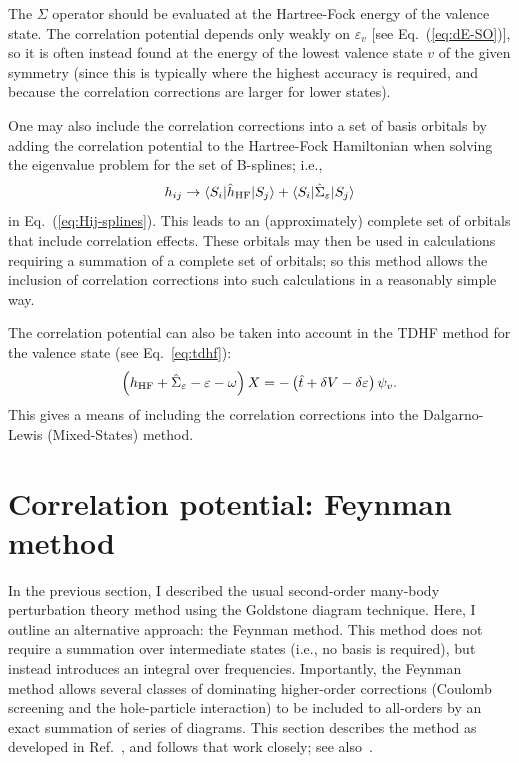 \documentclass[10pt,twocolumn,a4paper]{article}%
\newcommand{\bra}[1]{\ensuremath{\langle #1|}}	%
\newcommand{\ket}[1]{\ensuremath{|#1\rangle}}
\newcommand{\be}{\begin{equation}}
\newcommand{\ee}{\end{equation}}
\def\en{\ensuremath{\varepsilon}}
\newcommand{\w}{\ensuremath{\omega}}
\begin{document}
The $\Sigma$ operator should be evaluated at the Hartree-Fock energy of the valence state.
The correlation potential depends only weakly on $\en_v$ [see Eq.~(\ref{eq:dE-SO})],
so it is often instead found at the energy of the lowest valence state $v$ of the given symmetry (since this is typically where the highest accuracy is required, and because the correlation corrections are larger for lower states).


One may also include the correlation corrections into a set of basis orbitals by adding the correlation potential to the Hartree-Fock Hamiltonian when solving the eigenvalue problem for the set of B-splines; i.e.,
\be
h_{ij} \to \bra{S_i}\hat h_{\rm HF}\ket{S_j}  + \bra{S_i}\hat \Sigma_\en\ket{S_j} 
\ee
in Eq.~(\ref{eq:Hij-splines}).
This leads to an (approximately) complete set of orbitals that include correlation effects.
These orbitals may then be used in calculations requiring a summation of a complete set of orbitals; so this method allows the inclusion of correlation corrections into such calculations in a reasonably simple way.


The correlation potential can also be taken into account in the TDHF method for the valence state (see Eq.~\eqref{eq:tdhf}):
\be
\left( h_{\rm HF} +\hat\Sigma_\en -  \en -\w \right)X = -\left(\hat t + \delta V - \delta \en \right)\psi_v.
\ee
This gives a means of including the correlation corrections into the Dalgarno-Lewis (Mixed-States) method.




\section{Correlation potential: Feynman method}


In the previous section, I described the usual second-order many-body perturbation theory method using the Goldstone diagram technique.
Here, I outline an alternative approach: the Feynman method.
This method does not require a summation over intermediate states (i.e., no basis is required), but instead introduces an integral over frequencies.
Importantly, the Feynman method allows several classes of dominating higher-order corrections (Coulomb screening and the hole-particle interaction) to be included to all-orders by an exact summation of series of diagrams.
This section describes the method as developed in Ref.~\cite{DzubaCPM1988pla}, and follows that work closely; see also~\cite{Abrikosov1965,DzubaCPM1989plaEn,GingesCs2002}.
\end{document}

